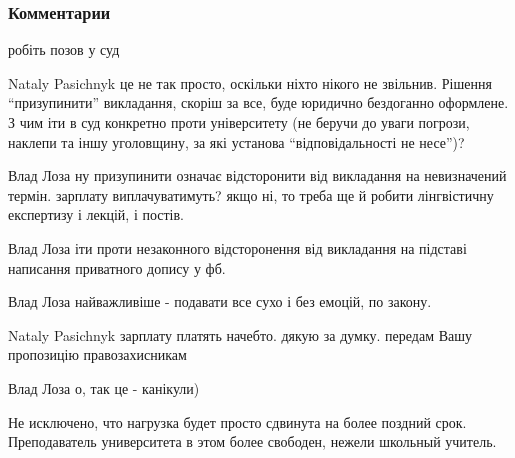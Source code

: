  
 
 
 
 
\subsubsection{Комментарии}

\begin{itemize}

робіть позов у суд


Nataly Pasichnyk це не так просто, оскільки ніхто нікого не звільнив. Рішення
\enquote{призупинити} викладання, скоріш за все, буде юридично бездоганно оформлене. З
чим іти в суд конкретно проти університету (не беручи до уваги погрози, наклепи
та іншу уголовщину, за які установа \enquote{відповідальності не несе})?


Влад Лоза ну призупинити означає відсторонити від викладання на невизначений
термін. зарплату виплачуватимуть? якщо ні, то треба ще й робити лінгвістичну
експертизу і лекцій, і постів.


Влад Лоза іти проти незаконного відсторонення від викладання на підставі
написання приватного допису у фб.


Влад Лоза найважливіше - подавати все сухо і без емоцій, по закону.


Nataly Pasichnyk зарплату платять начебто. дякую за думку. передам Вашу пропозицію правозахисникам

Влад Лоза о, так це - канікули)


Не исключено, что нагрузка будет просто сдвинута на более поздний срок.
Преподаватель университета в этом более свободен, нежели школьный учитель.



\end{itemize}
